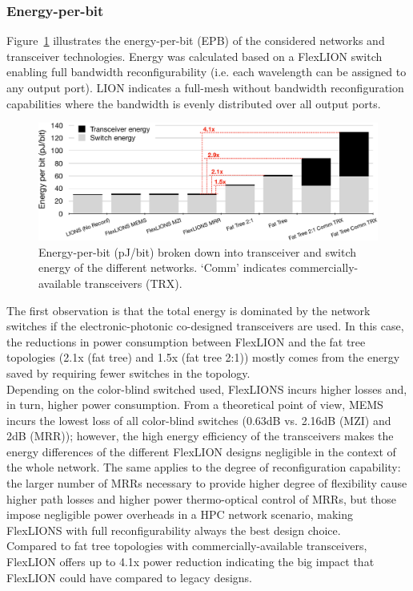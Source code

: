 \subsubsection{Energy-per-bit}
Figure~\ref{fig:epb} illustrates the energy-per-bit (EPB) of the considered networks and transceiver technologies. Energy was calculated based on a FlexLION switch enabling full bandwidth reconfigurability (i.e. each wavelength can be assigned to any output port). LION indicates a full-mesh without bandwidth reconfiguration capabilities where the bandwidth is evenly distributed over all output ports. 
\begin{figure}[t!]
    \centering
        \includegraphics[width=\linewidth, clip]{Figures/epb.pdf}
    \caption[]{Energy-per-bit (pJ/bit) broken down into transceiver and switch energy of the different networks. `Comm' indicates commercially-available transceivers (TRX).}
    \label{fig:epb}
\end{figure}
The first observation is that the total energy is dominated by the network switches if the electronic-photonic co-designed transceivers are used. In this case, the reductions in power consumption between FlexLION and the fat tree topologies (2.1x (fat tree) and 1.5x (fat tree 2:1)) mostly comes from the energy saved by requiring fewer switches in the topology. \\
Depending on the color-blind switched used, FlexLIONS incurs higher losses and, in turn, higher power consumption. From a theoretical point of view, MEMS incurs the lowest loss of all color-blind switches (0.63dB vs. 2.16dB (MZI) and 2dB (MRR)); however, the high energy efficiency of the transceivers makes the energy differences of the different FlexLION designs negligible in the context of the whole network. The same applies to the degree of reconfiguration capability: the larger number of MRRs necessary to provide higher degree of flexibility cause higher path losses and higher power thermo-optical control of MRRs, but those impose negligible power overheads in a HPC network scenario, making FlexLIONS with full reconfigurability always the best design choice. \\
Compared to fat tree topologies with commercially-available transceivers, FlexLION offers up to 4.1x power reduction indicating the big impact that FlexLION could have compared to legacy designs. 

